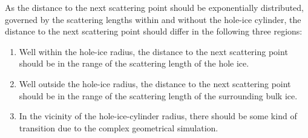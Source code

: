 As the distance to the next scattering point should be exponentially distributed, governed by the scattering lengths within and without the hole-ice cylinder, the distance to the next scattering point should differ in the following three regions:

\begin{enumerate}
  \item Well within the hole-ice radius, the distance to the next scattering point should be in the range of the scattering length of the hole ice.
  \item Well outside the hole-ice radius, the distance to the next scattering point should be in the range of the scattering length of the surrounding bulk ice.
  \item In the vicinity of the hole-ice-cylinder radius, there should be some kind of transition due to the complex geometrical simulation.
\end{enumerate}

